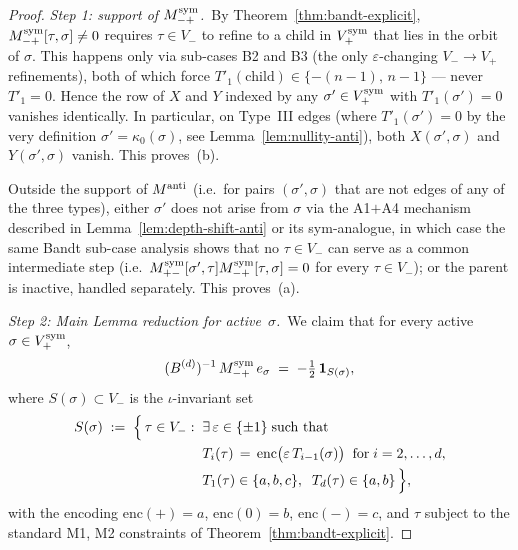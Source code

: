 \documentclass{amsart}
\theoremstyle{definition}
\theoremstyle{remark}
\begin{document}
\begin{proof}
\textit{Step 1: support of $M_{-+}^{\rm sym}$.}\ By
Theorem~\ref{thm:bandt-explicit}, $M_{-+}^{\rm sym}[\tau, \sigma]
\neq 0$ requires $\tau \in V_-$ to refine to a child in
$V_+^{\rm sym}$ that lies in the orbit of $\sigma$.  This
happens only via sub-cases B2 and B3 (the only
$\varepsilon$-changing $V_- \to V_+$ refinements), both of
which force $T'_1(\text{child}) \in \{-(n-1),\, n-1\}$ — never
$T'_1 = 0$.  Hence the row of $X$ and $Y$ indexed by any
$\sigma' \in V_+^{\rm sym}$ with $T'_1(\sigma') = 0$ vanishes
identically.  In particular, on Type~III edges (where
$T'_1(\sigma') = 0$ by the very definition $\sigma' =
\kappa_0(\sigma)$, see Lemma~\ref{lem:nullity-anti}), both
$X(\sigma', \sigma)$ and $Y(\sigma', \sigma)$ vanish.  This
proves~\textup{(b)}.

Outside the support of $M^{\rm anti}$ (i.e.\ for pairs
$(\sigma', \sigma)$ that are not edges of any of the three
types), either $\sigma'$ does not arise from $\sigma$ via the
A1$+$A4 mechanism described in Lemma~\ref{lem:depth-shift-anti}
or its sym-analogue, in which case the same Bandt sub-case
analysis shows that no $\tau \in V_-$ can serve as a common
intermediate step (i.e.\ $M_{+-}^{\rm sym}[\sigma', \tau]
M_{-+}^{\rm sym}[\tau, \sigma] = 0$ for every $\tau \in
V_-$); or the parent is inactive, handled separately.  This
proves~\textup{(a)}.

\medskip
\textit{Step 2: Main Lemma reduction for active~$\sigma$.}\
We claim that for every active $\sigma \in V_+^{\rm sym}$,
\begin{equation}\label{eq:main-lemma}
  (B^{(d)})^{-1}\, M_{-+}^{\rm sym}\, e_\sigma
  \;=\; -\tfrac12 \,\mathbf{1}_{S(\sigma)},
\end{equation}
where $S(\sigma) \subset V_-$ is the
$\iota$-invariant set
\begin{equation}\label{eq:S-sigma-def}
\begin{aligned}
  S(\sigma) \;:=\;\Bigl\{\, \tau \in V_- :\;\;
        & \exists\, \varepsilon \in \{\pm 1\}\;\text{such that}\\
        & T_i(\tau) \,=\, \mathrm{enc}\bigl(\varepsilon\,
                       T_{i-1}(\sigma)\bigr)
                  \;\;\text{for}\; i = 2, \ldots, d,\\
        & T_1(\tau) \in \{a, b, c\},\;\;
                  T_d(\tau) \in \{a, b\}\,\Bigr\},
\end{aligned}
\end{equation}
with the encoding $\mathrm{enc}(+) = a$, $\mathrm{enc}(0) = b$,
$\mathrm{enc}(-) = c$, and $\tau$ subject to the standard M1, M2
constraints of Theorem~\ref{thm:bandt-explicit}.


\end{proof}
\end{document}
